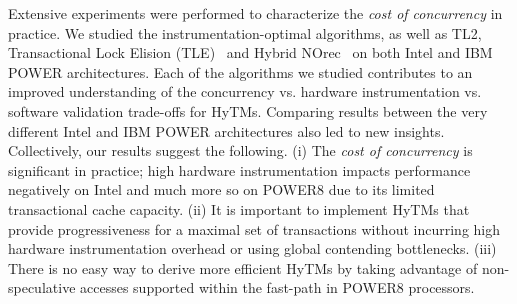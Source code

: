 Extensive experiments were performed to characterize the \textit{cost of concurrency} in practice.
We studied the instrumentation-optimal algorithms, as well as TL2, Transactional Lock Elision (TLE)~\cite{tle} and Hybrid NOrec~\cite{hynorecriegel} on both Intel and IBM POWER architectures.
Each of the algorithms we studied contributes to an improved understanding of the concurrency vs. hardware instrumentation vs. software validation trade-offs for HyTMs.
Comparing results between the very different Intel and IBM POWER architectures also led to new insights.
%
%
Collectively, our results suggest %
the following.
(i) The \emph{cost of concurrency} is significant in practice; high hardware instrumentation impacts performance negatively on Intel and much more so on POWER8 due to its limited transactional cache capacity.
(ii) It is important to implement HyTMs that provide progressiveness for a maximal set of transactions without incurring high hardware instrumentation overhead or using global contending bottlenecks.
(iii) There is no easy way to derive more efficient HyTMs by taking advantage of non-speculative accesses supported within the fast-path in POWER8 processors. %


